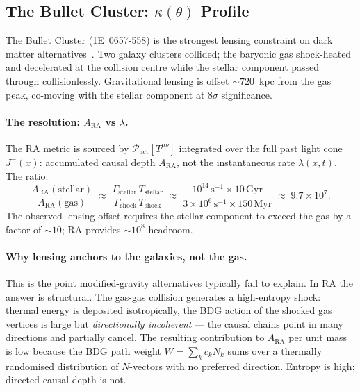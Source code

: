 \documentclass[11pt,a4paper]{article}
\theoremstyle{plain}
\theoremstyle{definition}
\theoremstyle{remark}
\newcommand{\Pact}{\mathcal{P}_{\mathrm{act}}}
\begin{document}
\subsection{The Bullet Cluster: \texorpdfstring{$\kappa(\theta)$}{kappa(theta)} Profile}
\label{sec:bullet}

The Bullet Cluster (1E~0657-558) is the strongest lensing constraint on
dark matter alternatives~\citep{Clowe2006}. Two galaxy clusters collided;
the baryonic gas shock-heated and decelerated at the collision centre while
the stellar component passed through collisionlessly. Gravitational lensing
is offset $\sim 720$~kpc from the gas peak, co-moving with the stellar
component at $8\sigma$ significance.

\paragraph{The resolution: $A_{\mathrm{RA}}$ vs $\lambda$.}
The RA metric is sourced by $\Pact[T^{\mu\nu}]$ integrated over the full
past light cone $J^-(x)$: accumulated causal depth $A_{\mathrm{RA}}$, not
the instantaneous rate $\lambda(x,t)$. The ratio:
\begin{equation}
  \frac{A_{\mathrm{RA}}(\mathrm{stellar})}{A_{\mathrm{RA}}(\mathrm{gas})}
  \;\approx\;
  \frac{\Gamma_{\mathrm{stellar}}\,T_{\mathrm{stellar}}}
       {\Gamma_{\mathrm{shock}}\,T_{\mathrm{shock}}}
  \;\approx\;
  \frac{10^{14}\,\mathrm{s}^{-1}\times 10\,\mathrm{Gyr}}
       {3\times10^6\,\mathrm{s}^{-1}\times 150\,\mathrm{Myr}}
  \;\approx\; 9.7\times10^7.
  \label{eq:RA_ratio}
\end{equation}
The observed lensing offset requires the stellar component to exceed
the gas by a factor of $\sim 10$; RA provides $\sim 10^8$ headroom.

\paragraph{Why lensing anchors to the galaxies, not the gas.}
This is the point modified-gravity alternatives typically fail to explain.
In RA the answer is structural. The gas-gas collision generates a
high-entropy shock: thermal energy is deposited isotropically, the
BDG action of the shocked gas vertices is large but
\emph{directionally incoherent} --- the causal chains point in many
directions and partially cancel. The resulting contribution to
$A_{\mathrm{RA}}$ per unit mass is low because the BDG path weight
$W = \sum_k c_k N_k$ sums over a thermally randomised distribution
of $N$-vectors with no preferred direction. Entropy is high; directed
causal depth is not.
\end{document}
